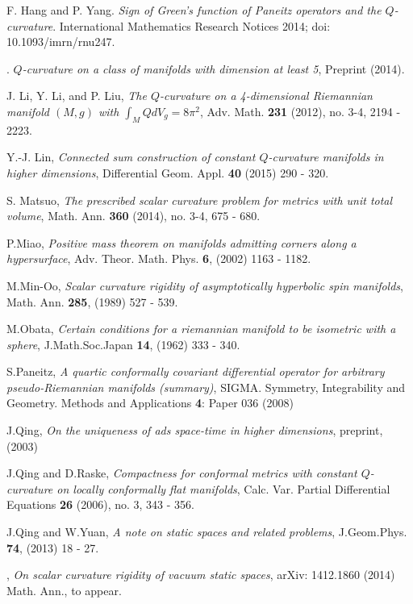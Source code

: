 \documentclass[12pt]{amsart}
\theoremstyle{definition}
\theoremstyle{remark}
\numberwithin{equation}{section}
\begin{document}
\begin{thebibliography}{10}
 F. Hang and P. Yang. \textit{Sign of Green's function of Paneitz operators and the $Q$-curvature}. International Mathematics Research Notices 2014; doi: 10.1093/imrn/rnu247.

 \bysame. \textit{$Q$-curvature on a class of manifolds with dimension at least 5}, Preprint (2014).

 J. Li, Y. Li, and P. Liu, \emph{The {$Q$}-curvature on a 4-dimensional Riemannian manifold {$(M,g)$} with {$\int_MQdV_g=8\pi^2$}}, Adv. Math. \textbf{231} (2012), no. 3-4, 2194 - 2223. 

 Y.-J. Lin, \textit{Connected sum construction of constant $Q$-curvature manifolds in higher dimensions}, Differential Geom. Appl. \textbf{40} (2015) 290 - 320. 

 S. Matsuo, \emph{The prescribed scalar curvature problem for metrics with unit total volume}, Math. Ann. \textbf{360} (2014), no. 3-4, 675 - 680.

 P.Miao, \textit{Positive mass theorem on manifolds admitting corners along a hypersurface}, Adv. Theor. Math. Phys. \textbf{6}, (2002) 1163 - 1182.

 M.Min-Oo, \textit{Scalar curvature rigidity of asymptotically hyperbolic spin manifolds}, Math. Ann. \textbf{285}, (1989) 527 - 539.

 M.Obata, \textit{Certain conditions for a riemannian manifold to be isometric with a sphere},
J.Math.Soc.Japan \textbf{14}, (1962) 333 - 340. 

 S.Paneitz, \textit{A quartic conformally covariant differential operator for arbitrary pseudo-Riemannian manifolds (summary)}, SIGMA. Symmetry, Integrability and Geometry. Methods and Applications \textbf{4}: Paper 036 (2008) 

 J.Qing, \textit{On the uniqueness of ads space-time in higher dimensions}, preprint, (2003)

 J.Qing and D.Raske, \textit{Compactness for conformal metrics with constant $Q$-curvature on locally conformally flat manifolds}, Calc. Var. Partial Differential Equations \textbf{26} (2006), no. 3, 343 - 356. 

 J.Qing and W.Yuan, \textit{A note on static spaces and related problems}, J.Geom.Phys. \textbf{74}, (2013) 18 - 27. 

 \bysame, \textit{On scalar curvature rigidity of vacuum static spaces}, arXiv: 1412.1860  (2014) Math. Ann., to appear.


\end{thebibliography}
\end{document}
